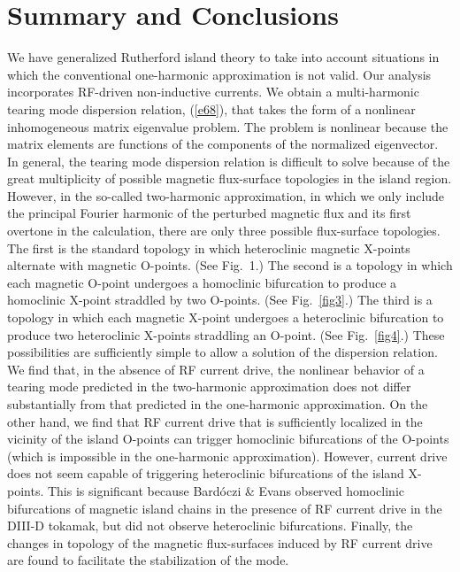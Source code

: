 \documentclass[12pt,prb,aps]{revtex4-1}
\begin{document}
\section{Summary and Conclusions}
We have generalized Rutherford island theory to take into account situations in which the conventional one-harmonic
approximation is not valid. Our analysis incorporates RF-driven non-inductive currents. We obtain a
multi-harmonic tearing mode dispersion relation, (\ref{e68}), that takes the form of a nonlinear inhomogeneous matrix
eigenvalue problem. The problem is nonlinear because the matrix elements are functions of the components of the normalized eigenvector. In general, the tearing mode dispersion relation  is difficult to solve because of the great multiplicity of
possible magnetic flux-surface topologies in the island region. However, in the so-called two-harmonic approximation,
in which we only include the principal Fourier harmonic of the perturbed magnetic flux and its first overtone in the calculation, there are
only three possible flux-surface topologies. The first is the standard topology in which heteroclinic magnetic X-points
alternate with magnetic O-points. (See Fig.~1.)  The second is a topology in which each magnetic O-point undergoes a
homoclinic bifurcation to produce a  homoclinic X-point straddled by two O-points. (See Fig.~\ref{fig3}.) The third
is a topology in which each magnetic X-point undergoes a heteroclinic bifurcation to produce two
heteroclinic X-points straddling an O-point. (See Fig.~\ref{fig4}.)  These possibilities are sufficiently simple to allow a solution of the dispersion relation. 
We find that, in the absence of RF current drive, the nonlinear behavior of a tearing
mode predicted in the two-harmonic approximation does not differ substantially from that predicted in the
 one-harmonic approximation. On the other hand, we find that RF current drive that is sufficiently localized in the
vicinity of the island O-points can trigger homoclinic bifurcations of the O-points (which is impossible in the one-harmonic approximation). However, current
drive does not seem capable of triggering heteroclinic bifurcations of the island X-points. This is significant because
 Bard\'{o}czi \& Evans observed homoclinic bifurcations of magnetic island chains in the presence of RF
 current drive in the DIII-D tokamak,\cite{bar}  but did not observe heteroclinic bifurcations. Finally, the changes in topology of the magnetic
 flux-surfaces induced by RF current drive are found to facilitate the stabilization of the mode. 
 
\end{document}
